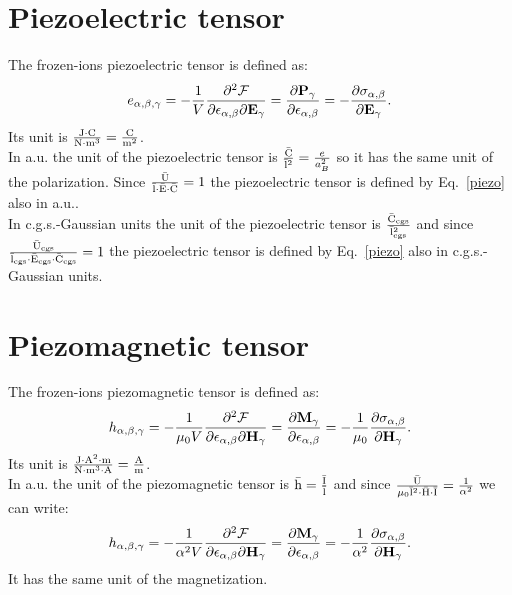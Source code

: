 \documentclass[12pt,a4paper,twoside]{report}
\begin{document}
\newpage
{\color{coral}\section{Piezoelectric tensor}}
\color{black}

The frozen-ions piezoelectric tensor is defined as:
\begin{equation}
e_{\alpha,\beta,\gamma}=-{1\over V} {\partial^2 \mathcal{F} \over \partial 
\epsilon_{\alpha,\beta} \partial {\bf E}_{\gamma}}={\partial 
{\bf P}_{\gamma} \over \partial \epsilon_{\alpha,\beta}}=
-{\partial \sigma_{\alpha,\beta} \over
\partial {\bf E}_{\gamma}}.
\label{piezo}
\end{equation}
Its unit is ${{\rm J}\cdot {\rm C} \over {\rm N} \cdot {\rm m}^3}= {{\rm C}\over {\rm m}^2}$.
\\

{\color{web-blue} In a.u. the unit of the piezoelectric tensor is
${{\rm \bar C} \over {\rm \bar l}^2}={e\over a_B^2}$ so it has the same unit of the
polarization. Since  
${{\rm \bar U} \over {\rm \bar l}\cdot {\rm \bar E}\cdot {\rm \bar C}}=1$ the piezoelectric tensor is
defined by Eq.~\ref{piezo} also in a.u..
}
\\

{\color{orange} In c.g.s.-Gaussian units the unit of the piezoelectric
tensor is
${{\rm \bar C_{cgs}} \over {\rm \bar l_{cgs}}^2}$ and since 
${{\rm \bar U_{cgs}} \over {\rm \bar l_{cgs}}\cdot {\rm \bar E_{cgs}}
\cdot {\rm \bar C_{cgs}}}=1$ 
the piezoelectric tensor is
defined by Eq.~\ref{piezo} also in c.g.s.-Gaussian units.
}

\newpage
{\color{coral}\section{Piezomagnetic tensor}}
\color{black}

The frozen-ions piezomagnetic tensor is defined as:
\begin{equation}
h_{\alpha,\beta,\gamma}=-{1\over \mu_0 V} 
{\partial^2 \mathcal{F} \over \partial 
\epsilon_{\alpha,\beta} \partial {\bf H}_{\gamma}}=
{\partial {\bf M}_{\gamma} \over \partial 
\epsilon_{\alpha,\beta}}=-{1\over \mu_0} 
{\partial \sigma_{\alpha,\beta} \over \partial {\bf H}_{\gamma}}.
\end{equation}
Its unit is ${{\rm J} \cdot {\rm A}^2 \cdot {\rm m}\over {\rm N} \cdot {\rm m}^3 \cdot {\rm A}}= {{\rm A}\over {\rm m}}$.
\\

{\color{web-blue} In a.u. the unit of the piezomagnetic tensor is
${\rm \bar h}={{\rm \bar I} \over {\rm \bar l}}$ and since 
${{\rm \bar U} \over \mu_0 {\rm \bar l}^2 \cdot {\rm \bar H} \cdot {\rm \bar I}}={1\over \alpha^2}$ we can write:
\begin{equation}
h_{\alpha,\beta,\gamma}=-{1\over \alpha^2 V} 
{\partial^2 \mathcal{F} \over \partial 
\epsilon_{\alpha,\beta} \partial {\bf H}_{\gamma}}=
{\partial {\bf M}_{\gamma} \over \partial 
\epsilon_{\alpha,\beta}}=-{1\over \alpha^2} 
{\partial \sigma_{\alpha,\beta} \over \partial {\bf H}_{\gamma}}.
\end{equation}
It has the same unit of the magnetization.
}
\\
\end{document}
